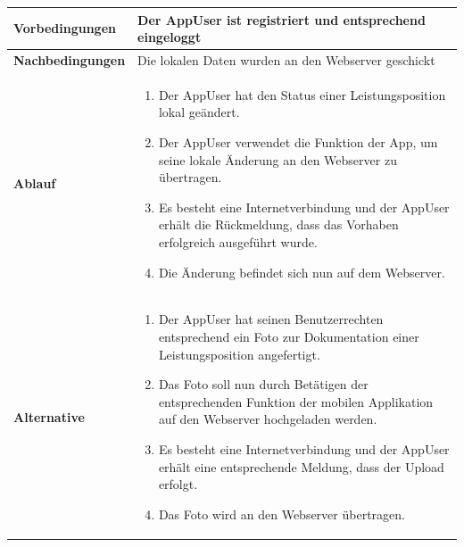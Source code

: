 \begin{longtable}[c]{|p{4cm}|p{10cm}|}
    \textbf{Vorbedingungen}             & Der AppUser ist registriert und entsprechend eingeloggt                                                                                                                                                                                                                                                           \\ \hline
    \textbf{Nachbedingungen}            & Die lokalen Daten wurden an den Webserver geschickt                                                                                                                                                                                                                                                               \\ \hline
    \textbf{Ablauf}                     &
    \begin{enumerate}
        \item Der AppUser hat den Status einer Leistungsposition lokal ge\"andert.
        \item Der AppUser verwendet die Funktion der App,  um seine lokale \"Anderung an den Webserver zu \"ubertragen.
        \item Es besteht eine Internetverbindung und der AppUser erh\"alt die R\"uckmeldung, dass das Vorhaben erfolgreich ausgef\"uhrt wurde.
        \item Die \"Anderung befindet sich nun auf dem Webserver.
    \end{enumerate}                                                                                                                                                                                                                                                                                                                               \\ \hline
    \textbf{Alternative}                &
    \begin{enumerate}
        \item Der AppUser hat seinen Benutzerrechten entsprechend ein Foto zur Dokumentation einer Leistungsposition angefertigt.
        \item Das Foto soll nun durch Bet\"atigen der entsprechenden Funktion der mobilen Applikation auf den Webserver hochgeladen werden.
        \item Es besteht eine Internetverbindung und der AppUser erh\"alt eine entsprechende Meldung,  dass der Upload erfolgt.
        \item Das Foto wird an den Webserver \"ubertragen.

\end{enumerate}
\end{longtable}
